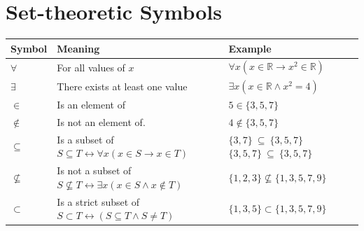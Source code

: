 \documentclass[a4paper, twoside]{article}
\newcommand{\R}{\mathbb{R}}
\newcommand{\rarrow}{\rightarrow}
\newcommand{\ioi}{\longleftrightarrow}
\begin{document}
\newpage

\section{Set-theoretic Symbols}

\begin{table}[H]
    \centering
    \begin{tabular}{|>{\centering\arraybackslash}m{2.5cm}|m{5cm}|>{\centering\arraybackslash}m{4cm}|}
        \hline\textbf{Symbol} & \textbf{Meaning} & \textbf{Example}\\\hline
        
        \(\forall\) & 
        For all values of \(x\) & 
        \(\forall x (x \in \R \rarrow x^2 \in \R)\) 
        \\\hline
        \(\exists\) & 
        There exists at least one value & 
        \(\exists x (x \in \R \land x^2 = 4)\) 
        \\\hline
        \(\in\) & 
        Is an element of & 
        \(5 \in \{3, 5, 7\}\)
        \\\hline
        \(\notin\) & 
        Is not an element of. & 
        \(4 \notin \{3, 5, 7\}\) 
        \\\hline
        \(\subseteq\) & 
        \makecell[l]{
            Is a subset of \\ 
            \( S \subseteq T \ioi \forall x(x \in S \rarrow x \in T)\)
        } &
        \makecell[c]{
            \(\{3,7\}~\subseteq~\{3,5,7\}\) \\
            \( \{3,5,7\}~\subseteq~\{3,5,7\} \)
        }
        \\\hline
        \( \nsubseteq \) &
        \makecell[l]{
            Is not a subset of \\
            \(S \nsubseteq T \ioi \exists x (x \in S \land x \notin T)\)
        } &
        \(\{1,2,3\} \nsubseteq \{1, 3, 5, 7, 9\}\)
        \\\hline
        \(\subset\) &
        \makecell[l]{
            Is a strict subset of \\
            \(S \subset T \ioi (S \subseteq T \land S \neq T)\)
        } &
        \(\{1, 3, 5\} \subset \{1, 3, 5, 7, 9\}\)

\end{tabular}
\end{table}
\end{document}
